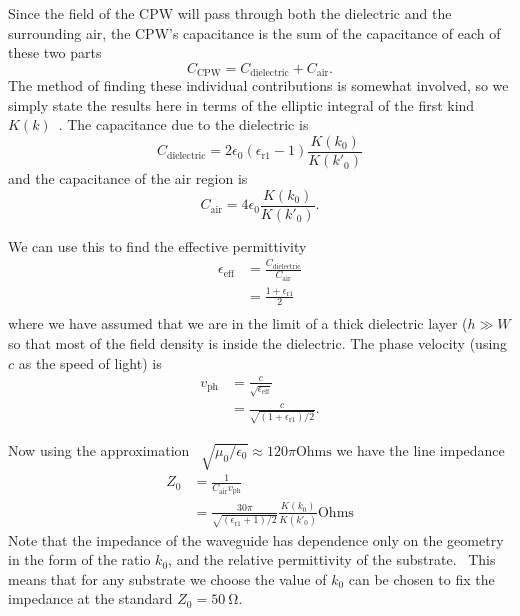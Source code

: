 Since the field of the CPW will pass through both the dielectric and the
surrounding air, the CPW's capacitance is the sum of the capacitance of each of
these two parts
%
\begin{equation}
  C_\text{CPW} = C_\text{dielectric} + C_\text{air}.
\end{equation}
%
The method of finding these individual contributions is somewhat involved, so
we simply state the results here in terms of the elliptic integral of the
first kind $K(k)$~\cite{Simons2004}. The capacitance due to the dielectric is
%
%
\begin{equation}
  C_\text{dielectric} = 2\epsilon_0(\epsilon_\text{r1}-1)\frac{K(k_0)}{K(k'_0)}
\end{equation}
%
and the capacitance of the air region is
%
\begin{equation}
  C_\text{air} = 4\epsilon_0 \frac{K(k_0)}{K(k'_0)}.
\end{equation}

We can use this to find the effective permittivity~\cite{Simons2004}
%
\begin{align}
  \epsilon_\text{eff} &= \frac{C_\text{dielectric}}{C_\text{air}} \\
    &= \frac{1+ \epsilon_\text{r1}}{2} \\
\end{align}
%
where we have assumed that we are in the limit of a thick dielectric layer ($h
\gg W$ so that most of the field density is inside the dielectric.
%
The phase velocity (using $c$ as the speed of light) is~\cite{Simons2004}
%
\begin{align}
  v_\text{ph} &= \frac{c}{\sqrt{\epsilon_\text{eff}}} \\
    &= \frac{c}{\sqrt{(1 + \epsilon_\text{r1})/2}}.
\end{align}

Now using the approximation~\cite{Collin2007}
$\sqrt{\mu_0/\epsilon_0}\approx120\pi\text{Ohms}$ we have the line
impedance~\cite{Simons2004}
\begin{align}
  Z_0 &= \frac{1}{C_\text{air} v_\text{ph}} \\
    &= \frac{30 \pi}{\sqrt{(\epsilon_\text{r1}+1)/2}} \frac{K(k_0)}{K(k'_0)}
    \text{Ohms}
    \label{mws:eqn:Z0}
\end{align}
Note that the impedance of the waveguide has dependence only on the geometry in
the form of the ratio $k_0$, and the relative permittivity of the
substrate.~\cite{Simons2004} This means that for any substrate we choose the
value of $k_0$ can be chosen to fix the impedance at the standard $Z_0 =
\SI{50}{\ohm}$.

